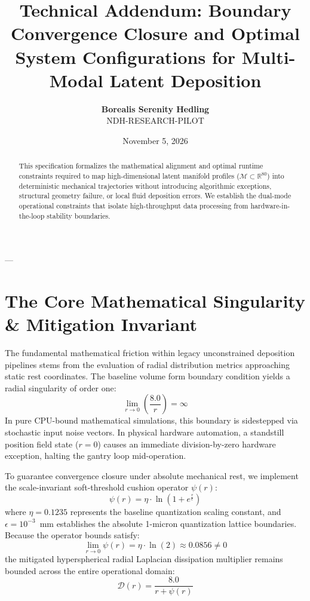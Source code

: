 \documentclass[11pt,twoside]{article}
\title{\textbf{Technical Addendum: Boundary Convergence Closure and Optimal System Configurations for Multi-Modal Latent Deposition}}
\author{\textbf{Borealis Serenity Hedling} \\ \small NDH-RESEARCH-PILOT}
\date{\small November 5, 2026}
\begin{document}
\maketitle

\begin{abstract}
This specification formalizes the mathematical alignment and optimal runtime constraints required to map high-dimensional latent manifold profiles ($\mathcal{M} \subset \mathbb{R}^{80}$) into deterministic mechanical trajectories without introducing algorithmic exceptions, structural geometry failure, or local fluid deposition errors. We establish the dual-mode operational constraints that isolate high-throughput data processing from hardware-in-the-loop stability boundaries.
\end{abstract}

---

\section{The Core Mathematical Singularity \& Mitigation Invariant}
The fundamental mathematical friction within legacy unconstrained deposition pipelines stems from the evaluation of radial distribution metrics approaching static rest coordinates. The baseline volume form boundary condition yields a radial singularity of order one:
\begin{equation}
    \lim_{r \to 0} \left( \frac{8.0}{r} \right) = \infty
\end{equation}
In pure CPU-bound mathematical simulations, this boundary is sidestepped via stochastic input noise vectors. In physical hardware automation, a standstill position field state ($r = 0$) causes an immediate division-by-zero hardware exception, halting the gantry loop mid-operation.

To guarantee convergence closure under absolute mechanical rest, we implement the scale-invariant soft-threshold cushion operator $\psi(r)$:
\begin{equation}
    \psi(r) = \eta \cdot \ln\left(1 + e^{\frac{r}{\epsilon}}\right)
\end{equation}
where $\eta = 0.1235$ represents the baseline quantization scaling constant, and $\epsilon = 10^{-3}$~mm establishes the absolute 1-micron quantization lattice boundaries. Because the operator bounds satisfy:
\begin{equation}
    \lim_{r \to 0} \psi(r) = \eta \cdot \ln(2) \approx 0.0856 \neq 0
\end{equation}
the mitigated hyperspherical radial Laplacian dissipation multiplier remains bounded across the entire operational domain:
\begin{equation}
    \mathcal{D}(r) = \frac{8.0}{r + \psi(r)}
\end{equation}
\end{document}
